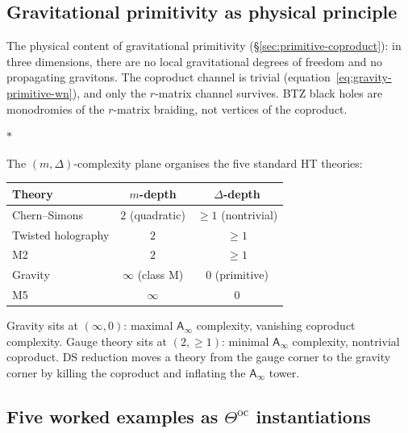 \documentclass[11pt]{article}
\newcommand{\Ainf}{\mathsf{A}_{\infty}}
\newcommand{\sep}{\bigskip\begin{center}$*$\end{center}\medskip}
\begin{document}
\subsection{Gravitational primitivity as physical principle}
\label{sec:gravitational-primitivity-physical}

The physical content of gravitational primitivity
(\S\ref{sec:primitive-coproduct}): in three dimensions, there are
no local gravitational degrees of freedom and no propagating
gravitons.  The coproduct channel is trivial
(equation~\eqref{eq:gravity-primitive-wn}), and only the
$r$-matrix channel survives.  BTZ black holes are monodromies of
the $r$-matrix braiding, not vertices of the coproduct.

\sep

The $(m, \Delta)$-complexity plane organises the five standard
HT theories:

\begin{center}
\small
\renewcommand{\arraystretch}{1.15}
\begin{tabular}{@{}lcc@{}}
\textbf{Theory} & $m$-depth & $\Delta$-depth \\
\hline
Chern--Simons & $2$ (quadratic) & $\geq 1$ (nontrivial) \\[3pt]
Twisted holography & $2$ & $\geq 1$ \\[3pt]
M2 & $2$ & $\geq 1$ \\[3pt]
Gravity & $\infty$ (class M) & $0$ (primitive) \\[3pt]
M5 & $\infty$ & $0$
\end{tabular}
\end{center}

\medskip

\noindent
Gravity sits at $(\infty, 0)$: maximal $\Ainf$ complexity,
vanishing coproduct complexity.  Gauge theory sits at
$(2, \geq 1)$: minimal $\Ainf$ complexity, nontrivial
coproduct.  DS reduction moves a theory from the gauge corner
to the gravity corner by killing the coproduct and inflating
the $\Ainf$ tower.


\subsection{Five worked examples as $\Theta^{\mathrm{oc}}$
  instantiations}
\label{sec:five-oc-instantiations}
\end{document}
